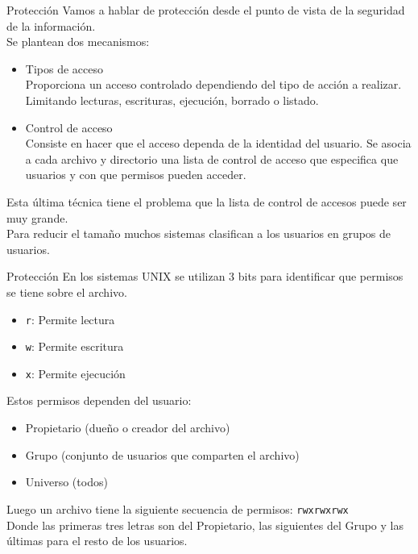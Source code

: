 \documentclass[aspectratio=169]{beamer}
\begin{document}
\begin{frame}[fragile,t]{Protección}
    Vamos a hablar de protección desde el punto de vista de la seguridad de la información.\\
    \bigskip
    \pause
    Se plantean dos mecanismos:\\
    \begin{itemize}
    \item \textcolor{naranjauca}{Tipos de acceso}\\
    Proporciona un acceso controlado dependiendo del tipo de acción a realizar. Limitando lecturas, escrituras, ejecución, borrado o listado.
    \pause
    \item \textcolor{naranjauca}{Control de acceso}\\
    Consiste en hacer que el acceso dependa de la identidad del usuario. Se asocia a cada archivo y directorio una lista de control de acceso que especifica que usuarios y con que permisos pueden acceder.
    \end{itemize}
    \bigskip
    \textcolor{verdeuca}{Esta última técnica tiene el problema que la lista de control de accesos puede ser muy grande.}\\
    Para reducir el tamaño muchos sistemas clasifican a los usuarios en grupos de usuarios.
\end{frame}

\begin{frame}[fragile,t]{Protección}
    En los sistemas UNIX se utilizan 3 bits para identificar que permisos se tiene sobre el archivo.\\
    \begin{itemize}
    \item \textcolor{verdeuca}{\texttt{r}}: Permite lectura
    \item \textcolor{verdeuca}{\texttt{w}}: Permite escritura
    \item \textcolor{verdeuca}{\texttt{x}}: Permite ejecución
    \end{itemize}
    \pause
    Estos permisos dependen del usuario:
    \begin{itemize}
    \item \textcolor{verdeuca}{Propietario} (dueño o creador del archivo)
    \item \textcolor{verdeuca}{Grupo} (conjunto de usuarios que comparten el archivo)
    \item \textcolor{verdeuca}{Universo} (todos)
    \end{itemize}
    \pause
    Luego un archivo tiene la siguiente secuencia de permisos: \textcolor{verdeuca}{\texttt{rwx}\texttt{rwx}\texttt{rwx}}\\
    \bigskip
    Donde las primeras tres letras son del Propietario, las siguientes del Grupo y las últimas para el resto de los usuarios.
\end{frame}
\end{document}
